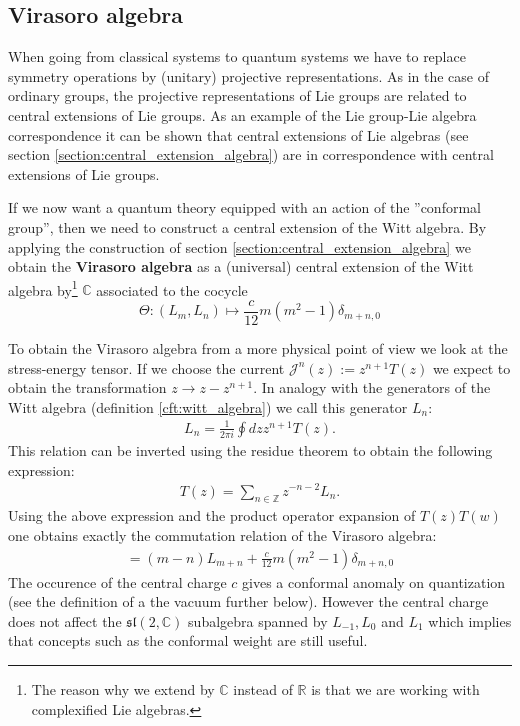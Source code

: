 \subsection{Virasoro algebra}

	When going from classical systems to quantum systems we have to replace symmetry operations by (unitary) projective representations. As in the case of ordinary groups, the projective representations of Lie groups are related to central extensions of Lie groups. As an example of the Lie group-Lie algebra correspondence it can be shown that central extensions of Lie algebras (see section \ref{section:central_extension_algebra}) are in correspondence with central extensions of Lie groups.
	
	If we now want a quantum theory equipped with an action of the ''conformal group'', then we need to construct a central extension of the Witt algebra. By applying the construction of section \ref{section:central_extension_algebra} we obtain the \textbf{Virasoro algebra} as a (universal) central extension of the Witt algebra by\footnote{The reason why we extend by $\mathbb{C}$ instead of $\mathbb{R}$ is that we are working with complexified Lie algebras.} $\mathbb{C}$ associated to the cocycle \[\Theta:(L_m, L_n)\mapsto \frac{c}{12}m(m^2-1)\delta_{m+n, 0}\]

	To obtain the Virasoro algebra from a more physical point of view we look at the stress-energy tensor. If we choose the current $\mathcal{J}^n(z) := z^{n+1}T(z)$ we expect to obtain the transformation $z\longrightarrow z-z^{n+1}$. In analogy with the generators of the Witt algebra (definition \ref{cft:witt_algebra}) we call this generator $L_n$:
	\begin{gather}
		L_n = \frac{1}{2\pi i}\oint dzz^{n+1}T(z).
	\end{gather}
	 This relation can be inverted using the residue theorem to obtain the following expression:
	\begin{gather}
		T(z) = \sum_{n\in\mathbb{Z}}z^{-n-2}L_n.
	\end{gather}
	Using the above expression and the product operator expansion of $T(z)T(w)$ one obtains exactly the commutation relation of the Virasoro algebra:
	\begin{gather}
		[L_m, L_n] = (m-n)L_{m+n} + \frac{c}{12}m(m^2-1)\delta_{m+n, 0}
	\end{gather}
	The occurence of the central charge $c$ gives a conformal anomaly on quantization (see the definition of a the vacuum further below). However the central charge does not affect the $\mathfrak{sl}(2, \mathbb{C})$ subalgebra spanned by $L_{-1}, L_0$ and $L_1$ which implies that concepts such as the conformal weight are still useful.

